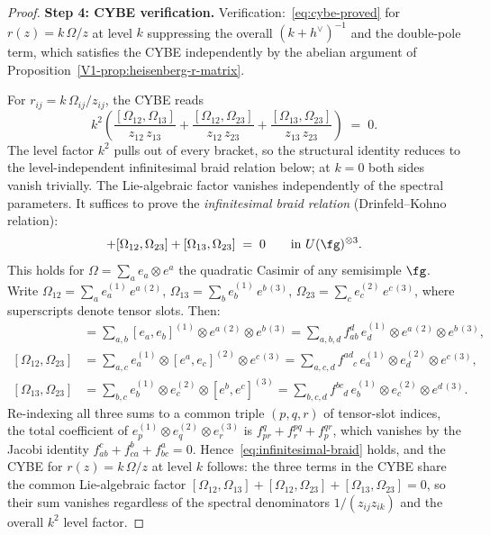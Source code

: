 \begin{proof}
\medskip
\noindent\textbf{Step 4: CYBE verification.}
Verification:~\eqref{eq:cybe-proved} for $r(z) = k\,\Omega/z$
at level $k$ suppressing the overall $(k+h^\vee)^{-1}$ and the double-pole term, which
satisfies the CYBE independently by the abelian argument of
Proposition~\ref{V1-prop:heisenberg-r-matrix}.

For $r_{ij} = k\,\Omega_{ij}/z_{ij}$, the CYBE reads
\[
k^2\left(
\frac{[\Omega_{12}, \Omega_{13}]}{z_{12}\, z_{13}}
+ \frac{[\Omega_{12}, \Omega_{23}]}{z_{12}\, z_{23}}
+ \frac{[\Omega_{13}, \Omega_{23}]}{z_{13}\, z_{23}}
\right)
\;=\; 0.
\]
The level factor $k^2$ pulls out of every bracket, so the
structural identity reduces to the level-independent
infinitesimal braid relation below; at $k = 0$ both sides
vanish trivially.
The Lie-algebraic factor vanishes
independently of the spectral parameters. It suffices to
prove the \emph{infinitesimal braid relation}
(Drinfeld--Kohno relation):
\begin{equation}%
[\Omega_{12}, \Omega_{13}]
+ [\Omega_{12}, \Omega_{23}]
+ [\Omega_{13}, \Omega_{23}]
\;=\; 0
\qquad \text{in } U(\fg)^{\otimes 3}.
\end{equation}
This holds for $\Omega = \sum_a e_a \otimes e^a$ the quadratic
Casimir of any semisimple $\fg$. Write
$\Omega_{12} = \sum_a e_a^{(1)}\, e^{a\,(2)}$,
$\Omega_{13} = \sum_b e_b^{(1)}\, e^{b\,(3)}$,
$\Omega_{23} = \sum_c e_c^{(2)}\, e^{c\,(3)}$,
where superscripts denote tensor slots. Then:
\begin{align*}
[\Omega_{12}, \Omega_{13}]
&= \sum_{a,b} [e_a, e_b]^{(1)} \otimes e^{a\,(2)} \otimes e^{b\,(3)}
= \sum_{a,b,d} f_{ab}^d\, e_d^{(1)} \otimes e^{a\,(2)}
 \otimes e^{b\,(3)}, \\
[\Omega_{12}, \Omega_{23}]
&= \sum_{a,c} e_a^{(1)} \otimes [e^a, e_c]^{(2)} \otimes e^{c\,(3)}
= \sum_{a,c,d} f^{ad}_{\phantom{ad}c}\, e_a^{(1)} \otimes e_d^{(2)}
 \otimes e^{c\,(3)}, \\
[\Omega_{13}, \Omega_{23}]
&= \sum_{b,c} e_b^{(1)} \otimes e_c^{(2)} \otimes [e^b, e^c]^{(3)}
= \sum_{b,c,d} f^{bc}_{\phantom{bc}d}\, e_b^{(1)} \otimes e_c^{(2)}
 \otimes e^{d\,(3)}.
\end{align*}
Re-indexing all three sums to a common triple $(p,q,r)$ of
tensor-slot indices, the total coefficient of
$e_p^{(1)} \otimes e_q^{(2)} \otimes e_r^{(3)}$ is
$f_{pr}^q + f^{pq}_r + f^{qr}_p$, which vanishes by the
Jacobi identity $f_{ab}^c + f_{ca}^b + f_{bc}^a = 0$.
Hence~\eqref{eq:infinitesimal-braid} holds, and the CYBE
for $r(z) = k\,\Omega/z$ at level $k$ follows: the three terms in the CYBE
share the common Lie-algebraic factor
$[\Omega_{12}, \Omega_{13}] + [\Omega_{12}, \Omega_{23}]
+ [\Omega_{13}, \Omega_{23}] = 0$,
so their sum vanishes regardless of the spectral denominators
$1/(z_{ij}z_{ik})$ and the overall $k^2$ level factor.
\end{proof}

